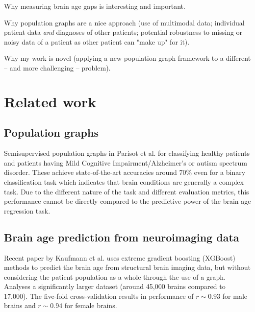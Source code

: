 \documentclass[12pt,a4paper,twoside, openright, hidelinks]{report}
\begin{document}
Why measuring brain age gaps is interesting and important.

Why population graphs are a nice approach (use of multimodal data; individual patient data \textit{and} diagnoses of other patients; potential robustness to missing or noisy data of a patient as other patient can "make up" for it).

Why my work is novel (applying a new population graph framework to a different – and more challenging – problem).

\section{Related work}

\subsection{Population graphs}
Semisupervised population graphs in Parisot et al. for classifying healthy patients and patients having Mild Cognitive Impairment/Alzheimer's or autism spectrum disorder. These achieve state-of-the-art accuracies around 70\% even for a binary classification task which indicates that brain conditions are generally a complex task. Due to the different nature of the task and different evaluation metrics, this performance cannot be directly compared to the predictive power of the brain age regression task.

\subsection{Brain age prediction from neuroimaging data}
Recent paper by Kaufmann et al. uses extreme gradient boosting (XGBoost) methods to predict the brain age from structural brain imaging data, but without considering the patient population as a whole through the use of a graph. Analyses a significantly larger dataset (around 45,000 brains compared to 17,000). The five-fold cross-validation results in performance of $r \sim 0.93$ for male brains and $r \sim 0.94$ for female brains.
\end{document}
